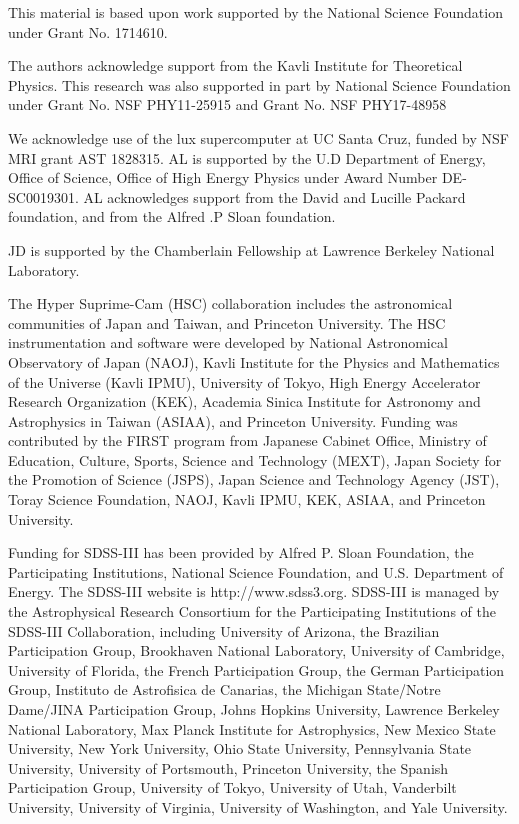 \documentclass[fleqn,usenatbib,useAMS]{mnras}
\begin{document}
  This material is based upon work supported by the National Science Foundation under
  Grant No. 1714610.

  The authors acknowledge support from the Kavli Institute for Theoretical Physics.
  This research was also supported in part by National Science Foundation under Grant
  No. NSF PHY11-25915 and Grant No. NSF PHY17-48958

  We acknowledge use of the lux supercomputer at UC Santa Cruz, funded by NSF MRI grant AST
  1828315. AL is supported by the U.D Department of Energy, Office of Science, Office of High
  Energy Physics under Award Number DE-SC0019301. AL acknowledges support from the David and
  Lucille Packard foundation, and from the Alfred .P Sloan foundation.
  
  JD is supported by the Chamberlain Fellowship at Lawrence Berkeley National Laboratory.
  
  The Hyper Suprime-Cam (HSC) collaboration includes the astronomical communities of
  Japan and Taiwan, and Princeton University.  The HSC instrumentation and software were
  developed by National Astronomical Observatory of Japan (NAOJ), Kavli Institute
  for the Physics and Mathematics of the Universe (Kavli IPMU), University of Tokyo,
  High Energy Accelerator Research Organization (KEK), Academia Sinica Institute
  for Astronomy and Astrophysics in Taiwan (ASIAA), and Princeton University.
  Funding was contributed by the FIRST program from Japanese Cabinet Office,  Ministry
  of Education, Culture, Sports, Science and Technology (MEXT), Japan Society for
  the Promotion of Science (JSPS), Japan Science and Technology Agency (JST), Toray
  Science Foundation, NAOJ, Kavli IPMU, KEK, ASIAA, and Princeton University.

  Funding for SDSS-III has been provided by Alfred P. Sloan Foundation, the
  Participating Institutions, National Science Foundation, and U.S. Department of
  Energy. The SDSS-III website is http://www.sdss3.org.  SDSS-III is managed by the
  Astrophysical Research Consortium for the Participating Institutions of the SDSS-III
  Collaboration, including University of Arizona, the Brazilian Participation Group,
  Brookhaven National Laboratory, University of Cambridge, University of Florida, the
  French Participation Group, the German Participation Group, Instituto de Astrofisica
  de Canarias, the Michigan State/Notre Dame/JINA Participation Group, Johns Hopkins
  University, Lawrence Berkeley National Laboratory, Max Planck Institute for
  Astrophysics, New Mexico State University, New York University, Ohio State University,
  Pennsylvania State University, University of Portsmouth, Princeton University, the
  Spanish Participation Group, University of Tokyo, University of Utah, Vanderbilt
  University, University of Virginia, University of Washington, and Yale University.
\end{document}
